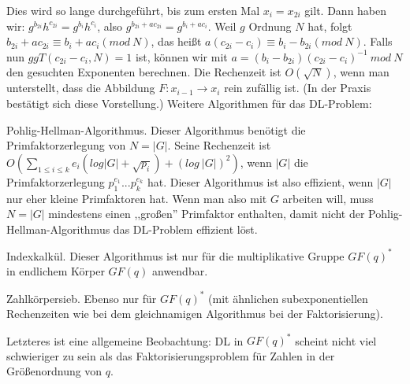 \documentclass[a4paper]{article}
\begin{document}
\begin{multicols}{3}
        Dies wird so lange durchgeführt, bis zum ersten Mal $x_i=x_{2i}$ gilt. Dann haben wir: $g^{b_{2i}} h^{c_{2i}}=g^{b_i} h^{c_i}$, also $g^{b_{2i}+ac_{2i}}=g^{b_i+ac_i}$. Weil $g$ Ordnung $N$ hat, folgt $b_{2i} +ac_{2i}\equiv b_i+ac_i (mod\ N)$, das heißt $a(c_{2i}-c_i)\equiv b_i-b_{2i} (mod\ N)$.
        Falls nun $ggT(c_{2i}-c_i,N) = 1$ ist, können wir mit $a= (b_i-b_{2i})(c_{2i}-c_i)^{-1}\ mod\ N$ den gesuchten Exponenten berechnen.
        Die Rechenzeit ist $O(\sqrt{N})$, wenn man unterstellt, dass die Abbildung $F:x_{i-1}\rightarrow x_i$ rein zufällig ist. (In der Praxis bestätigt sich diese Vorstellung.)
        Weitere Algorithmen für das DL-Problem:
        \begin{itemize*}
            \item Pohlig-Hellman-Algorithmus. Dieser Algorithmus benötigt die Primfaktorzerlegung von $N=|G|$. Seine Rechenzeit ist $O(\sum_{1 \leq i\leq k} e_i(log|G|+\sqrt{p_i}) + (log\ |G|)^2)$, wenn $|G|$ die Primfaktorzerlegung $p^{e_1}_1... p^{e_k}_k$ hat. Dieser Algorithmus ist also effizient, wenn $|G|$ nur eher kleine Primfaktoren hat. Wenn man also mit $G$ arbeiten will, muss $N=|G|$ mindestens einen ,,großen'' Primfaktor enthalten, damit nicht der Pohlig-Hellman-Algorithmus das DL-Problem effizient löst.
            \item Indexkalkül. Dieser Algorithmus ist nur für die multiplikative Gruppe $GF(q)^*$ in endlichem Körper $GF(q)$ anwendbar.
            \item Zahlkörpersieb. Ebenso nur für $GF(q)^*$ (mit ähnlichen subexponentiellen Rechenzeiten wie bei dem gleichnamigen Algorithmus bei der Faktorisierung).
        \end{itemize*}

        Letzteres ist eine allgemeine Beobachtung: DL in $GF(q)^*$ scheint nicht viel schwieriger zu sein als das Faktorisierungsproblem für Zahlen in der Größenordnung von $q$.


\end{multicols}
\end{document}
